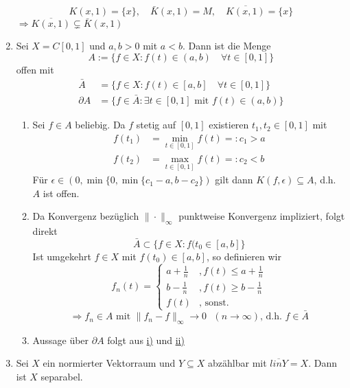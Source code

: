 \begin{beispiel}
\begin{enumerate}[label=\alph*\upshape)]
			\[ K(x, 1) = \{ x \}, \quad \bar K(x, 1) = M, \quad \overline{K(x, 1)} = \{ x \} \]
			$\Rightarrow \overline{K(x, 1)} \subsetneq \bar K(x, 1)$
		\item \label{bsp:1-4.11.b} Sei $X = C[0, 1]$ und $a, b > 0$ mit $a < b$. Dann ist die Menge
			\[ A := \{ f \in X: f(t) \in (a, b) \quad \forall t \in [0, 1] \} \]
			offen mit
			\begin{align*}
				\bar A & = \{ f \in X: f(t) \in [a, b] \quad \forall t \in [0, 1] \} \\
				\partial A & = \{ f \in \bar A: \exists t \in [0, 1] \text{ mit } f(t) \in (a, b) \}
			\end{align*}
			\begin{beweis}
				\begin{enumerate} 
					\item Sei $f \in A$ beliebig. Da $f$ stetig auf $[0, 1]$ existieren $t_{1}, t_{2} \in [0, 1]$ mit
						\begin{align*}
							f(t_{1}) & = \min_{t \in [0, 1]} f(t) =: c_{1} > a \\
							f(t_{2}) & = \max_{t \in [0, 1]} f(t) =: c_{2} < b
						\end{align*}
						Für $\epsilon \in (0, \min \{0, \min \{ c_{1} - a, b - c_{2} \})$ gilt dann $K(f, \epsilon) \subseteq A$, d.h. $A$ ist offen.
					\item Da Konvergenz bezüglich $\| \cdot \|_{\infty}$ punktweise Konvergenz impliziert, folgt direkt
						\[ \bar A \subset \{ f \in X: f(t_{0} \in [a, b] \} \]
						Ist umgekehrt $f \in X$ mit $f(t_{0}) \in [a, b]$, so definieren wir
						\[ f_{n}(t) = \begin{cases} a + \frac{1}{n} &, f(t) \leq a + \frac{1}{n} \\ b - \frac{1}{n} &, f(t) \geq b - \frac{1}{n} \\ f(t) &, \text{ sonst.}  \end{cases}   \]
						\[ \Rightarrow f_{n} \in A \text{ mit } \| f_{n} - f \|_{\infty} \rightarrow 0 \text{ } (n \rightarrow \infty) \text{, d.h. } f \in \bar A \]
					\item Aussage über $\partial A$ folgt aus \hyperref[bsp:1-4.11.b]{i)} und \hyperref[bsp:1-4.11.b]{ii)}
				\end{enumerate}
			\end{beweis}
		\item Sei $X$ ein normierter Vektorraum und $Y \subseteq X$ abzählbar mit $\overline{lin Y} = X$. Dann ist $X$ separabel.

\end{enumerate}
\end{beispiel}
